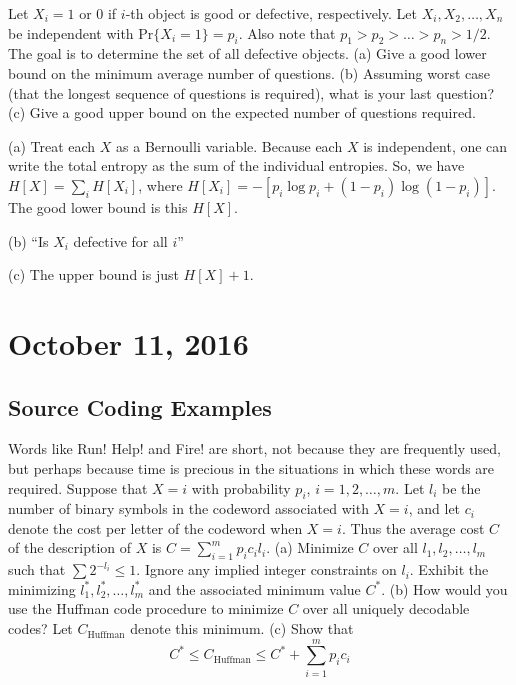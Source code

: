 \documentclass[11pt]{article}
\theoremstyle{definition}
\begin{document}
\example Let $X_i = 1$ or $0$ if $i$-th object is good or defective, respectively. Let $X_i, X_2, \dots, X_n$ be independent with $\text{Pr} \{X_i = 1\} = p_i$. Also note that $p_1 > p_2 > \dots > p_n > 1/2$. The goal is to determine the set of all defective objects.  (a) Give a good lower bound on the minimum average number of questions. (b) Assuming worst case (that the longest sequence of questions is required), what is your last question? (c) Give a good upper bound on the expected number of questions required. 

(a) Treat each $X$ as a Bernoulli variable. Because each $X$ is independent, one can write the total entropy as the sum of the individual entropies. So, we have $H[X] = \sum_i H[X_i]$, where $H[X_i] = -[p_i \log p_i + (1-p_i) \log (1-p_i)]$. The good lower bound is this $H[X]$.

(b) ``Is $X_i$ defective for all $i$''

(c) The upper bound is just $H[X] + 1$. 

\section{October 11, 2016}

\subsection{Source Coding Examples}


 Words like Run! Help! and Fire! are short, not because they are frequently used, but perhaps because time is precious in the situations in which these words are required. Suppose that $X = i$ with probability $p_i$, $i = 1, 2, \dots, m$. Let $l_i$ be the number of binary symbols in the codeword associated with $X = i$, and let $c_i$ denote the cost per letter of the codeword when $X = i$. Thus the average cost $C$ of the description of $X$ is $C = \sum_{i=1}^m p_i c_i l_i$. 
(a) Minimize $C$ over all $l_1, l_2, \dots, l_m$ such that $\sum 2^{-l_i} \leq 1$. Ignore any implied integer constraints on $l_i$. Exhibit the minimizing $l_1^*,l_2^*, \dots, l_m^*$ and the associated minimum value $C^*$.
(b) How would you use the Huffman code procedure to minimize $C$ over all uniquely decodable codes? Let $C_{\text{Huffman}}$ denote this minimum.
(c) Show that $$C^* \leq C_{\text{Huffman}} \leq C^* + \sum_{i = 1}^m p_i c_i$$
\end{document}
